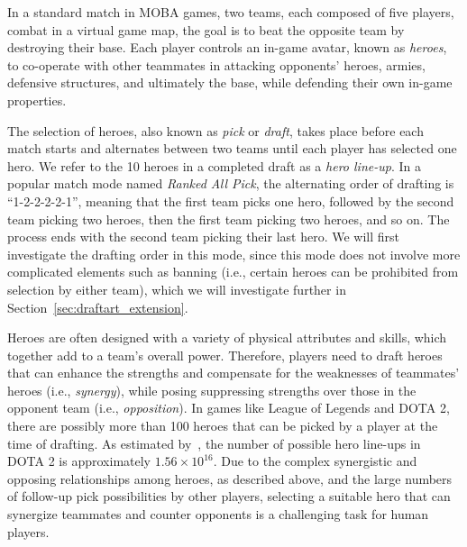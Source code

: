 In a standard match in MOBA games, two teams, each composed of five players, combat in a virtual game map, the goal is to beat the opposite team by destroying their base. Each player controls an in-game avatar, known as \textit{heroes}, to co-operate with other teammates in attacking opponents' heroes, armies, defensive structures, and ultimately the base, while defending their own in-game properties. 

The selection of heroes, also known as \textit{pick} or \textit{draft}, takes place before each match starts and alternates between two teams until each player has selected one hero. We refer to the 10 heroes in a completed draft as a \textit{hero line-up}. In a popular match mode
named \textit{Ranked All Pick}, the alternating order of drafting is ``1-2-2-2-2-1'', meaning that the first team picks one hero, followed by the second team picking two heroes, then the first team picking two heroes, and so on. The process ends with the second team picking their last hero. We will first investigate the drafting order in this mode, since this mode does not involve more complicated elements such as banning (i.e., certain heroes can be prohibited from selection by either team), which we will investigate further in Section~\ref{sec:draftart_extension}. 

Heroes are often designed with a variety of physical attributes and skills, which together add to a team's overall power. Therefore, players need to draft heroes that can enhance the strengths and compensate for the weaknesses of teammates' heroes (i.e., \textit{synergy}), while posing suppressing strengths over those in the opponent team (i.e., \textit{opposition}). In games like League of Legends and DOTA 2, there are possibly more than 100 heroes that can be picked by a player at the time of drafting. As estimated by~\cite{hanke2017reco}, the number of possible hero line-ups in DOTA 2 is approximately $1.56 \times 10^{16}$. Due to the complex synergistic and opposing relationships among heroes, as described above, and the large numbers of follow-up pick possibilities by other players, selecting a suitable hero that can synergize teammates and counter opponents is a challenging task for human players. 


